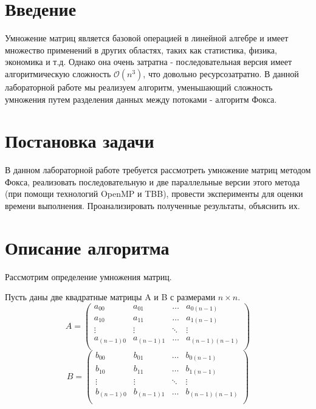 \documentclass{article}
\begin{document}
\setcounter{page}{2}

\tableofcontents
\newpage

\section*{Введение}
\setcounter{section}{1}
\par 
Умножение матриц является базовой операцией в линейной алгебре и имеет множество применений в других областях, таких как
статистика, физика, экономика и т.д. Однако она очень затратна - последовательная версия имеет алгоритмическую сложность 
$\mathcal{O}(n^3)$, что довольно ресурсозатратно. В данной лабораторной работе мы реализуем алгоритм, уменьшающий сложность умножения
путем разделения данных между потоками - алгоритм Фокса. 
\newpage

\section*{Постановка задачи}
\par 
В данном лабораторной работе требуется рассмотреть умножение матриц методом Фокса, реализовать последовательную
и две параллельные версии этого метода (при помощи технологий OpenMP и TBB), провести эксперименты для оценки времени выполнения. 
Проанализировать полученные результаты, объяснить их.
\newpage

\section*{Описание алгоритма}
\par
Рассмотрим определение умножения матриц.
\par
Пусть даны две квадратные матрицы A и B с размерами \(n \times n\).
\[ 
  A = \left( 
    \begin{matrix}
      a_{00} & a_{0 1} & \ldots & a_{0(n-1)}\\
      a_{10} & a_{1 1} & \ldots & a_{1(n-1)}\\
      \vdots & \vdots & \ddots & \vdots\\
      a_{(n-1)0} & a_{(n-1)1} & \ldots & a_{(n-1)(n-1)}\\
    \end{matrix}
  \right)
\]
\[
  B = \left( 
    \begin{matrix}
      b_{00} & b_{0 1} & \ldots & b_{0(n-1)}\\
      b_{10} & b_{1 1} & \ldots & b_{1(n-1)}\\
      \vdots & \vdots & \ddots & \vdots\\
      b_{(n-1)0} & b_{(n-1)1} & \ldots & b_{(n-1)(n-1)}\\
    \end{matrix}
  \right)
\]
\end{document}
